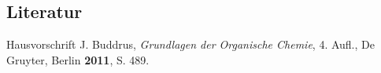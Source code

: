\documentclass[12pt]{article}
\begin{document}
\begin{onehalfspace}
\section{Literatur}
\renewcommand{\section}[2]{}%
\begin{thebibliography}{}
Hausvorschrift
J. Buddrus, \textit{Grundlagen der Organische Chemie}, 4. Aufl., De Gruyter, Berlin \textbf{2011}, S. 489.
\end{thebibliography}
\end{onehalfspace}
\end{document}
